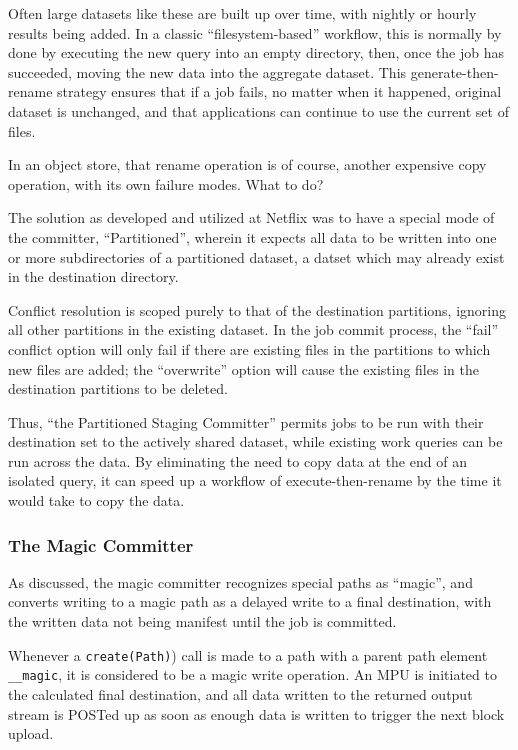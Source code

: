 \documentclass[conference]{IEEEtran}
\begin{document}
Often large datasets like these are built up over time, with nightly or hourly
results being added.
In a classic ``filesystem-based'' workflow, this is normally by done by
executing the new query into an empty directory, then, once the job has succeeded,
moving the new data into the aggregate dataset.
This generate-then-rename strategy ensures that if a job fails, no matter when
it happened, original dataset is unchanged,
and that applications can continue to use the current set of files.

In an object store, that rename operation is of course, another expensive copy
operation, with its own failure modes.
What to do?

The solution as developed and utilized at Netflix was to have a special mode
of the committer, ``Partitioned'', wherein it expects all data to be written
into one or more subdirectories of a partitioned dataset, a datset which
may already exist in the destination directory.

Conflict resolution is scoped purely to that of the destination partitions,
ignoring all other partitions in the existing dataset.
In the job commit process, the ``fail'' conflict option will only fail if there
are existing files in the partitions to which new files are added;
the ``overwrite'' option will cause the existing files in the destination
partitions to be deleted.

Thus, ``the Partitioned Staging Committer''
permits jobs to be run with their destination set to the actively
shared dataset, while existing work queries can be run across the data.
By eliminating the need to copy data at the end of an isolated query,
it can speed up a workflow of execute-then-rename by the time it would
take to copy the data.





\subsubsection{The Magic Committer}


As discussed, the magic committer recognizes special paths as ``magic'',
and converts writing to a magic path as a delayed write to a final destination,
with the written data not being manifest until the job is committed.


Whenever a \texttt{create(Path)}) call is made to a path with a parent path element \texttt{__magic},
it is considered to be a magic write operation.
An MPU is initiated to the calculated final destination, and all data written
to the returned output stream is POSTed up as soon as enough data is written
to trigger the next block upload.
\end{document}
